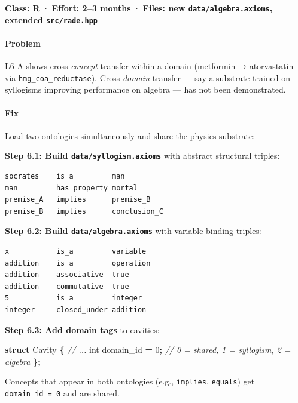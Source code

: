 \documentclass[
  11pt,
  a4paper,
]{article}
\newenvironment{Shaded}{\begin{snugshade}}{\end{snugshade}}
\newcommand{\CommentTok}[1]{\textcolor[rgb]{0.56,0.35,0.01}{\textit{#1}}}
\newcommand{\DataTypeTok}[1]{\textcolor[rgb]{0.13,0.29,0.53}{#1}}
\newcommand{\DecValTok}[1]{\textcolor[rgb]{0.00,0.00,0.81}{#1}}
\newcommand{\KeywordTok}[1]{\textcolor[rgb]{0.13,0.29,0.53}{\textbf{#1}}}
\newcommand{\NormalTok}[1]{#1}
\newcommand{\OperatorTok}[1]{\textcolor[rgb]{0.81,0.36,0.00}{\textbf{#1}}}
\begin{document}
\textbf{Class: R} · \textbf{Effort: 2--3 months} · \textbf{Files: new
\texttt{data/algebra.axioms}, extended \texttt{src/rade.hpp}}

\paragraph{Problem}\label{problem-5}

L6-A shows cross-\emph{concept} transfer within a domain (metformin →
atorvastatin via \texttt{hmg\_coa\_reductase}). Cross-\emph{domain}
transfer --- say a substrate trained on syllogisms improving performance
on algebra --- has not been demonstrated.

\paragraph{Fix}\label{fix-5}

Load two ontologies simultaneously and share the physics substrate:

\textbf{Step 6.1: Build \texttt{data/syllogism.axioms}} with abstract
structural triples:

\begin{verbatim}
socrates    is_a         man
man         has_property mortal
premise_A   implies      premise_B
premise_B   implies      conclusion_C
\end{verbatim}

\textbf{Step 6.2: Build \texttt{data/algebra.axioms}} with
variable-binding triples:

\begin{verbatim}
x           is_a         variable
addition    is_a         operation
addition    associative  true
addition    commutative  true
5           is_a         integer
integer     closed_under addition
\end{verbatim}

\textbf{Step 6.3: Add domain tags} to cavities:

\begin{Shaded}
\begin{Highlighting}[]
\KeywordTok{struct}\NormalTok{ Cavity }\OperatorTok{\{}
    \CommentTok{// ...}
    \DataTypeTok{int}\NormalTok{ domain\_id }\OperatorTok{=} \DecValTok{0}\OperatorTok{;}    \CommentTok{// 0 = shared, 1 = syllogism, 2 = algebra}
\OperatorTok{\};}
\end{Highlighting}
\end{Shaded}

Concepts that appear in both ontologies (e.g., \texttt{implies},
\texttt{equals}) get \texttt{domain\_id\ =\ 0} and are shared.
\end{document}
